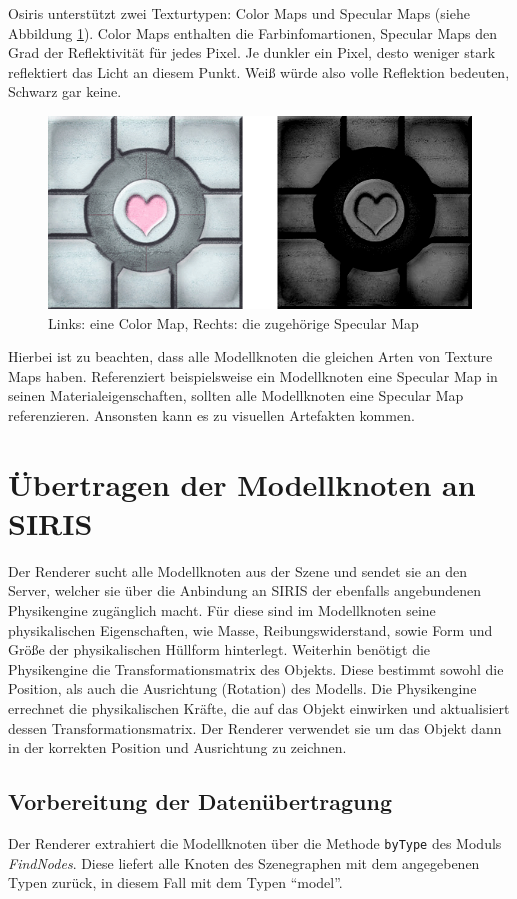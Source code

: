 Osiris unterstützt zwei Texturtypen: Color Maps und Specular Maps (siehe Abbildung \ref{fig:texturemaps}). Color Maps enthalten die Farbinfomartionen, Specular Maps den Grad der Reflektivität für jedes Pixel. Je dunkler ein Pixel, desto weniger stark reflektiert das Licht an diesem Punkt. Weiß würde also volle Reflektion bedeuten, Schwarz gar keine.
\begin{figure}
\centering
\includegraphics[width=\textwidth]{bilder/texturemaps.png}
\caption{Links: eine Color Map, Rechts: die zugehörige Specular Map}
\label{fig:texturemaps}
\end{figure}

Hierbei ist zu beachten, dass alle Modellknoten die gleichen Arten von Texture Maps haben. Referenziert beispielsweise ein Modellknoten eine Specular Map in seinen Materialeigenschaften, sollten alle Modellknoten eine Specular Map referenzieren. Ansonsten kann es zu visuellen Artefakten kommen.

\section{Übertragen der Modellknoten an SIRIS}
Der Renderer sucht alle Modellknoten aus der Szene und sendet sie an den Server, welcher sie über die Anbindung an SIRIS der ebenfalls angebundenen Physikengine zugänglich macht. Für diese sind im Modellknoten seine physikalischen Eigenschaften, wie Masse, Reibungswiderstand, sowie Form und Größe der physikalischen Hüllform hinterlegt. Weiterhin benötigt die Physikengine die Transformationsmatrix des Objekts. Diese bestimmt sowohl die Position, als auch die Ausrichtung (Rotation) des Modells. Die Physikengine errechnet die physikalischen Kräfte, die auf das Objekt einwirken und aktualisiert dessen Transformationsmatrix. Der Renderer verwendet sie um das Objekt dann in der korrekten Position und Ausrichtung zu zeichnen.

\subsection{Vorbereitung der Datenübertragung}
Der Renderer extrahiert die Modellknoten über die Methode \texttt{byType} des Moduls \textit{FindNodes}. Diese liefert alle Knoten des Szenegraphen mit dem angegebenen Typen zurück, in diesem Fall mit dem Typen "`model"'.

